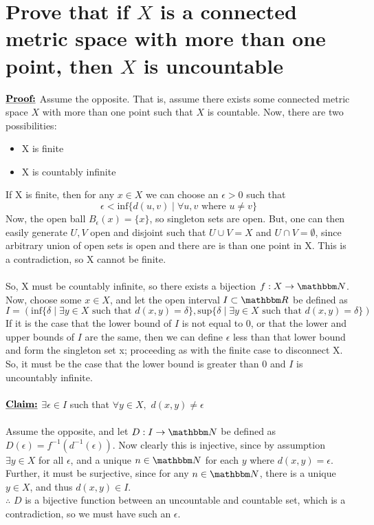 \documentclass{article}
\begin{document}
\section{Prove that if $X$ is a connected metric space with more than one point, then $X$ is uncountable}
$\textbf{\underline{Proof:}}$ Assume the opposite. That is, assume there exists some connected metric space $X$ with more than one point such that $X$ is countable. Now, there are two possibilities:
\begin{itemize}
	\item X is finite
	\item X is countably infinite
\end{itemize}
If X is finite, then for any $x \in X$ we can choose an $\epsilon > 0$ such that 
$$\epsilon < \textrm{inf} \{d(u, v) \; | \; \forall u, v \textrm{ where } u \neq v\}$$
Now, the open ball $B_\epsilon(x) = \{x\}$, so singleton sets are open. But, one can then easily generate $U, V$ open and disjoint such that $U \cup V = X$ and $U \cap V = \emptyset$, since arbitrary union of open sets is open and there are is than one point in X. This is a contradiction, so X cannot be finite. \\ \\
So, X must be countably infinite, so there exists a bijection $f: X \rightarrow \N$. Now, choose some $x \in X$, and let the open interval $I \subset \R$ be defined as 
$$I = (\textrm{inf}\{\delta \; |\; \exists y \in X \textrm{ such that } d(x, y) = \delta \}, \textrm{sup}\{\delta \; |\; \exists y \in X \textrm{ such that } d(x, y) = \delta \})$$
If it is the case that the lower bound of $I$ is not equal to 0, or that the lower and upper bounds of $I$ are the same, then we can define $\epsilon$ less than that lower bound and form the singleton set {x}; proceeding as with the finite case to disconnect X. So, it must be the case that the lower bound is greater than 0 and $I$ is uncountably infinite. \\ \\
$\textbf{\underline{Claim:}}$ $\exists\epsilon \in I$ such that $\forall y \in X,$ $d(x, y) \neq \epsilon$ \\ \\
Assume the opposite, and let $D: I \rightarrow \N$ be defined as $D(\epsilon) = f^{-1}(d^{-1}(\epsilon))$. Now clearly this is injective, since by assumption $\exists y \in X$ for all $\epsilon$, and a unique $n \in \N$ for each $y$ where $d(x, y) = \epsilon$. Further, it must be surjective, since for any $n \in \N$, there is a unique $y \in X$, and thus $d(x, y) \in I$. \\ $\therefore$ $D$ is a bijective function between an uncountable and countable set, which is a contradiction, so we must have such an $\epsilon$. \\ \\
\end{document}
